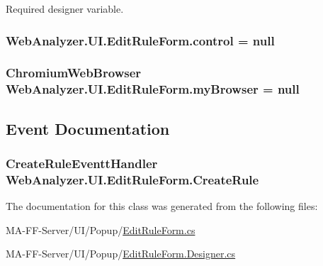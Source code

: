 Required designer variable. 

\hypertarget{class_web_analyzer_1_1_u_i_1_1_edit_rule_form_a9d1ff11c0ffd1f01406c687f6b10a873}{}
\subsubsection[{control}]{ Web\+Analyzer.\+U\+I.\+Edit\+Rule\+Form.\+control = null\hspace{0.3cm}{\ttfamily [private]}}\label{class_web_analyzer_1_1_u_i_1_1_edit_rule_form_a9d1ff11c0ffd1f01406c687f6b10a873}
\hypertarget{class_web_analyzer_1_1_u_i_1_1_edit_rule_form_a13a68bf348e8745e5ea013dc3a3f4ea6}{}
\subsubsection[{my\+Browser}]{\setlength{\rightskip}{0pt plus 5cm}Chromium\+Web\+Browser Web\+Analyzer.\+U\+I.\+Edit\+Rule\+Form.\+my\+Browser = null\hspace{0.3cm}{\ttfamily [private]}}\label{class_web_analyzer_1_1_u_i_1_1_edit_rule_form_a13a68bf348e8745e5ea013dc3a3f4ea6}


\subsection{Event Documentation}
\hypertarget{class_web_analyzer_1_1_u_i_1_1_edit_rule_form_a270cf87236a05ce56741d8df75a16a0c}{}
\subsubsection[{Create\+Rule}]{\setlength{\rightskip}{0pt plus 5cm}Create\+Rule\+Eventt\+Handler Web\+Analyzer.\+U\+I.\+Edit\+Rule\+Form.\+Create\+Rule}\label{class_web_analyzer_1_1_u_i_1_1_edit_rule_form_a270cf87236a05ce56741d8df75a16a0c}


The documentation for this class was generated from the following files\+:\begin{DoxyCompactItemize}
\item 
M\+A-\/\+F\+F-\/\+Server/\+U\+I/\+Popup/\hyperlink{_edit_rule_form_8cs}{Edit\+Rule\+Form.\+cs}\item 
M\+A-\/\+F\+F-\/\+Server/\+U\+I/\+Popup/\hyperlink{_edit_rule_form_8_designer_8cs}{Edit\+Rule\+Form.\+Designer.\+cs}\end{DoxyCompactItemize}
